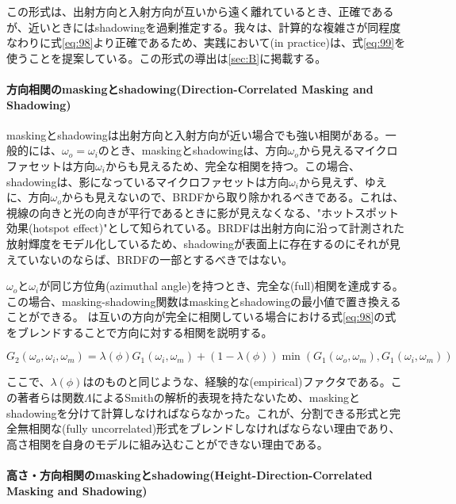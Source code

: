 \documentclass[a4j,xelatex,ja=standard]{bxjsarticle}
\begin{document}
この形式は、出射方向と入射方向が互いから遠く離れているとき、正確であるが、近いときにはshadowingを過剰推定する。我々は、計算的な複雑さが同程度なわりに式\eqref{eq:98}より正確であるため、実践において(in practice)は、式\eqref{eq:99}を使うことを提案している。この形式の導出は\ref{sec:B}に掲載する。

\paragraph{方向相関のmaskingとshadowing(Direction-Correlated Masking and Shadowing)}

maskingとshadowingは出射方向と入射方向が近い場合でも強い相関がある。一般的には、$\omega_o = \omega_i$のとき、maskingとshadowingは、方向$\omega_o$から見えるマイクロファセットは方向$\omega_i$からも見えるため、完全な相関を持つ。この場合、shadowingは、影になっているマイクロファセットは方向$\omega_i$から見えず、ゆえに、方向$\omega_o$からも見えないので、BRDFから取り除かれるべきである。これは、視線の向きと光の向きが平行であるときに影が見えなくなる、"ホットスポット効果(hotspot effect)"として知られている。BRDFは出射方向に沿って計測された放射輝度をモデル化しているため、shadowingが表面上に存在するのにそれが見えていないのならば、BRDFの一部とするべきではない。

$\omega_o$と$\omega_i$が同じ方位角(azimuthal angle)を持つとき、完全な(full)相関を達成する。この場合、masking-shadowing関数はmaskingとshadowingの最小値で置き換えることができる。\citeauthor{Ashikmin2000} \cite{Ashikmin2000}は互いの方向が完全に相関している場合における式\eqref{eq:98}の式をブレンドすることで方向に対する相関を説明する。

\begin{equation}
    G_2(\omega_o, \omega_i, \omega_m) = \lambda(\phi)G_1(\omega_i, \omega_m) + (1 - \lambda(\phi)) \min(G_1(\omega_o, \omega_m), G_1(\omega_i, \omega_m))
    \label{eq:100}
\end{equation}

ここで、$\lambda(\phi)$は\citeauthor{Ginneken1998}のものと同じような、経験的な(empirical)ファクタである。この著者らは関数$\Lambda$によるSmithの解析的表現を持たないため、maskingとshadowingを分けて計算しなければならなかった。これが、分割できる形式と完全無相関な(fully uncorrelated)形式をブレンドしなければならない理由であり、高さ相関を自身のモデルに組み込むことができない理由である。

\paragraph{高さ・方向相関のmaskingとshadowing(Height-Direction-Correlated Masking and Shadowing)}
\end{document}
